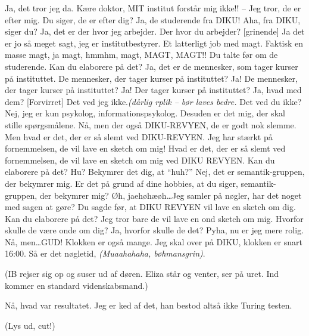 \documentclass[10pt]{article}
\begin{document}
\begin{sketch}
 Ja, det tror jeg da. Kære doktor, MIT institut forstår mig ikke!!
-- Jeg tror, de er efter mig. 
 Du siger, de er efter dig?
 Ja, de studerende fra DIKU!
 Aha, fra DIKU, siger du?
 Ja, det er der hvor jeg arbejder.
 Der hvor du arbejder?
 [grinende] Ja det er jo så meget sagt, jeg er institutbestyrer.
Et latterligt job med magt. Faktisk en masse magt, ja magt, hmmhm, magt,
MAGT, MAGT!!
 Du talte før om de studerende. Kan du elaborere på det?
 Ja, det er de mennesker, som tager kurser på instituttet.
 De mennesker, der tager kurser på instituttet?
 Ja!
 De mennesker, der tager kurser på instituttet?
 Ja!
 Der tager kurser på instituttet?
 Ja, hvad med dem?
 [Forvirret] Det ved jeg ikke.{\em (dårlig rplik -- bør laves bedre.}
 Det ved du ikke?
 Nej, jeg er kun psykolog, informationspsykolog. Desuden er
det mig, der skal stille spørgsmålene.
  Nå, men der også DIKU-REVYEN, de er godt nok slemme.
 Men hvad er det, der er så slemt ved DIKU-REVYEN.
 Jeg har stærkt på fornemmelsen, de vil lave en sketch om mig!
 Hvad er det, der er så slemt ved fornemmelsen, de vil lave en
sketch om mig ved DIKU REVYEN. Kan du elaborere på det?
 Hu?
 Bekymrer det dig, at ``huh?''
 Nej, det er semantik-gruppen, der bekymrer mig.
 Er det på grund af dine hobbies, at du siger,
semantik-gruppen, der bekymrer mig?
 Øh, jaehøhæøh\ldots Jeg samler på nøgler, har det noget med sagen
at gøre?
 Du sagde før, at DIKU REVYEN vil lave en sketch om dig. Kan du
elaborere på det?
 Jeg tror bare de vil lave en ond sketch om mig.
 Hvorfor skulle de være onde om dig?
 Ja, hvorfor skulle de det? Pyha, nu er jeg mere rolig. Nå, 
men\ldots GUD! Klokken er også mange. Jeg skal over på DIKU, klokken er
snart  16:00. Så er det nøgletid, {\em (Muaahahaha, bøhmansgrin)}.

\scene (IB rejser sig op og suser ud af døren. Eliza står og venter, ser
på uret. Ind kommer en standard videnskabsmand.)

 Nå, hvad var resultatet.
 Jeg er ked af det, han bestod altså ikke Turing
testen.

\scene (Lys ud, cut!)

\end{sketch}
\end{document}

